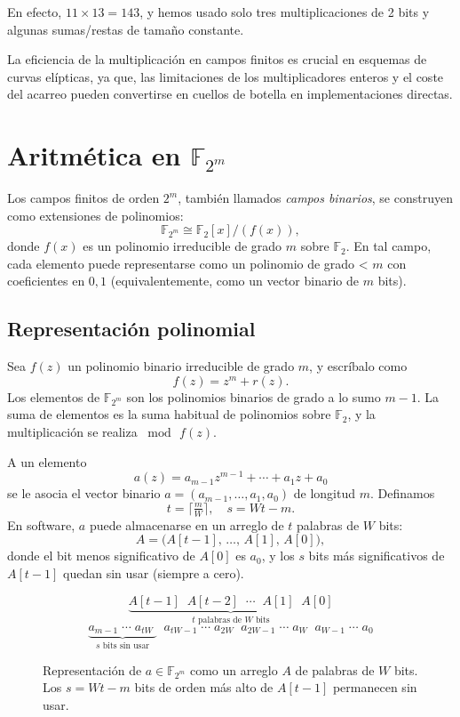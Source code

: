 En efecto, \(11 \times 13 = 143\), y hemos usado solo tres multiplicaciones de 2 bits y algunas sumas/restas de tamaño constante.


La eficiencia de la multiplicación en campos finitos es crucial en esquemas de curvas elípticas, ya que, las limitaciones de los multiplicadores enteros y el coste del acarreo pueden convertirse en cuellos de botella en implementaciones directas.

\section{Aritmética en \texorpdfstring{$\mathbb{F}_{2^m}$}{F2m}}
Los campos finitos de orden $2^m$, también llamados \emph{campos binarios}, se construyen como extensiones de polinomios:
\[
  \mathbb{F}_{2^m}\cong\mathbb{F}_2[x]/(f(x)),
\]
donde $f(x)$ es un polinomio irreducible de grado $m$ sobre $\mathbb{F}_2$.
En tal campo, cada elemento puede representarse como un polinomio de grado < $m$ con coeficientes en ${0,1}$ (equivalentemente, como un vector binario de $m$ bits).

\subsection{Representación polinomial}
Sea \(f(z)\) un polinomio binario irreducible de grado \(m\), y escríbalo como
\[
  f(z) = z^m + r(z).
\]
Los elementos de \(\mathbb{F}_{2^m}\) son los polinomios binarios de grado a lo sumo \(m-1\). La suma de elementos es la suma habitual de polinomios sobre \(\mathbb{F}_2\), y la multiplicación se realiza \(\bmod\,f(z)\).

A un elemento
\[
  a(z) = a_{m-1}z^{m-1} + \cdots + a_1 z + a_0
\]
se le asocia el vector binario
\(\displaystyle a = (a_{m-1},\dots,a_1,a_0)\) de longitud \(m\). Definamos
\[
  t = \bigl\lceil\tfrac{m}{W}\bigr\rceil,
  \quad
  s = Wt - m.
\]
En software, \(a\) puede almacenarse en un arreglo de \(t\) palabras de \(W\) bits:
\[
  A = \bigl(A[t-1],\,\dots,\,A[1],\,A[0]\bigr),
\]
donde el bit menos significativo de \(A[0]\) es \(a_0\), y los \(s\) bits más significativos de \(A[t-1]\) quedan sin usar (siempre a cero).

\begin{figure}[H]
\[
\underbrace{A[t-1]\;\;A[t-2]\;\;\cdots\;\;A[1]\;\;A[0]}_{\text{\(t\) palabras de \(W\) bits}}
\]
\[
\underbrace{a_{m-1}\;\cdots\;a_{tW}\;}_{s\text{ bits sin usar}}\;\;
a_{tW-1}\;\cdots\;a_{2W}\;\;
a_{2W-1}\;\cdots\;a_{W}\;\;
a_{W-1}\;\cdots\;a_{0}
\]
\caption{Representación de \(a\in\mathbb{F}_{2^m}\) como un arreglo \(A\) de palabras de \(W\) bits. Los \(s = Wt - m\) bits de orden más alto de \(A[t-1]\) permanecen sin usar.}
\label{fig:word_representation}
\end{figure}


